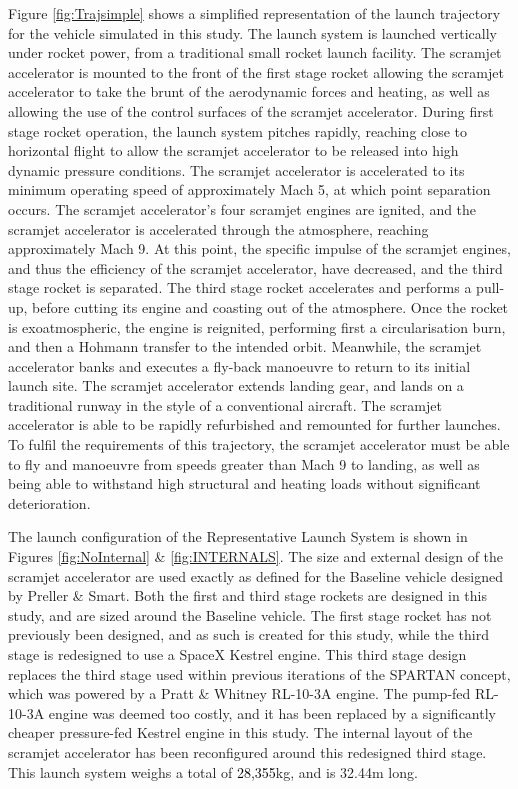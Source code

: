  Figure \ref{fig:Trajsimple} shows a simplified representation of the launch trajectory for the vehicle simulated in this study.
 The launch system is launched vertically under rocket power, from a traditional small rocket launch facility. The scramjet accelerator is mounted to the front of the first stage rocket allowing the scramjet accelerator to take the brunt of the aerodynamic forces and heating, as well as allowing the use of the control surfaces of the scramjet accelerator. During first stage rocket operation, the launch system pitches rapidly, reaching close to horizontal flight to allow the scramjet accelerator to be released into high dynamic pressure conditions. The scramjet accelerator is accelerated to its minimum operating speed of approximately Mach 5, at which point separation occurs. The scramjet accelerator's four scramjet engines are ignited, and the scramjet accelerator is accelerated through the atmosphere, reaching approximately Mach 9. At this point, the specific impulse of the scramjet engines, and thus the efficiency of the scramjet accelerator, have decreased, and the third stage rocket is separated. The third stage rocket accelerates and performs a pull-up, before cutting its engine and coasting out of the atmosphere. Once the rocket is exoatmospheric, the engine is reignited, performing first a circularisation burn, and then a Hohmann transfer to the intended orbit. Meanwhile, the scramjet accelerator banks and executes a fly-back manoeuvre to return to its initial launch site. The scramjet accelerator extends landing gear, and lands on a traditional runway in the style of a conventional aircraft. The scramjet accelerator is able to be rapidly refurbished and remounted for further launches. To fulfil the requirements of this trajectory, the scramjet accelerator must be able to fly and manoeuvre from speeds greater than Mach 9 to landing, as well as being able to withstand high structural and heating loads without significant deterioration.
 
 The launch configuration of the Representative Launch System is shown in Figures \ref{fig:NoInternal} \& \ref{fig:INTERNALS}. 
 The size and external design of the scramjet accelerator are used exactly as defined for the Baseline vehicle designed by Preller \& Smart\cite{Preller2017b}. Both the first and third stage rockets are designed in this study, and are sized around the Baseline vehicle. 
 The first stage rocket has not previously been designed, and as such is created for this study, while the third stage is redesigned to use a SpaceX Kestrel engine. This third stage design replaces the third stage used within previous iterations of the SPARTAN concept, which was powered by a Pratt \& Whitney RL-10-3A engine\cite{Preller2017b}. The pump-fed RL-10-3A engine was deemed too costly, and it has been replaced by a significantly cheaper pressure-fed Kestrel engine in this study.  
 The internal layout of the scramjet accelerator has been reconfigured around this redesigned third stage. 
 This launch system weighs a total of \textcolor{black}{28,355}kg, and is 32.44m long. 
 
